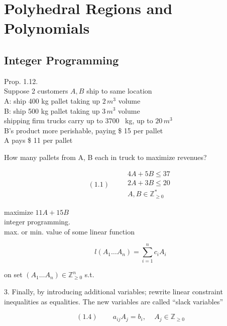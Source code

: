 \section{ Polyhedral Regions and Polynomials }

\subsection{ Integer Programming }

Prop. 1.12. \\

Suppose 2 customers $A, B$ ship to same location \\
\quad A: ship 400 kg pallet taking up $2 \, m^3$ volume \\
\quad B: ship 500 kg pallet taking up $3 \, m^3$ volume \\

shipping firm trucks carry up to 3700 \, kg, up to $20 \, m^3$ \\

B's product more perishable, paying \$ 15 per pallet \\

A pays \$ 11 per pallet

How many pallets from A, B each in truck to maximize revenues?

\begin{equation}
(1.1) \quad \quad \, \begin{gathered}
    4A + 5B \leq 37 \\
    2A  + 3B \leq 20 \\
    A, B \in \mathbb{Z}^*_{ \geq 0 } \end{gathered}
\end{equation}

maximize $11 A + 15 B$ \\

integer programming. \\
max. or min. value of some linear function 

\[
l(A_1 \dots A_n) = \sum_{i=1}^n c_i A_i 
\]

on set $(A_1 \dots A_n) \in \mathbb{Z}^n_{ \geq 0}$ s.t. 


3. Finally, by introducing additional variables; rewrite linear constraint inequalities as equalities. The new variables are called ``slack variables''

\begin{equation}
(1.4) \quad \quad \, a_{ij} A_j = b_i, \quad \, A_j \in \mathbb{Z}_{\geq 0}
\end{equation}

